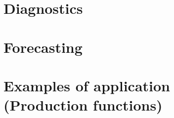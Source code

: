 \documentclass[
]{book}
\begin{document}
\hypertarget{diagnostics}{%
\section{Diagnostics}\label{diagnostics}}

\hypertarget{forecasting}{%
\section{Forecasting}\label{forecasting}}

\hypertarget{examples-of-application-production-functions}{%
\section{Examples of application (Production functions)}\label{examples-of-application-production-functions}}

  
\end{document}

